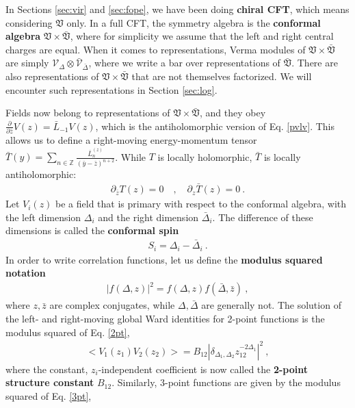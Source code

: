 \documentclass[12pt, a4paper]{article}
\theoremstyle{break}
\begin{document}
In Sections \ref{sec:vir} and \ref{sec:fope}, we have been doing \textbf{chiral CFT}, which means considering $\mathfrak{V}$ only. In a full CFT, the symmetry algebra is the \textbf{conformal algebra} $\mathfrak{V}\times \bar{\mathfrak{V}}$, where for simplicity we assume that the left and right central charges are equal. When it comes to representations, Verma modules of $\mathfrak{V}\times \bar{\mathfrak{V}}$ are simply $\mathcal{V}_\Delta\otimes \bar{\mathcal{V}}_{\bar \Delta}$, where we write a bar over representations of $\bar{\mathfrak{V}}$. There are also representations of $\mathfrak{V}\times \bar{\mathfrak{V}}$ that are not themselves factorized. We will encounter such representations in Section \ref{sec:log}. 

Fields now belong to representations of $\mathfrak{V}\times \bar{\mathfrak{V}}$, and they obey $\frac{\partial}{\partial \bar z} V(z) = \bar L_{-1} V(z)$, which is the antiholomorphic version of Eq. \eqref{pvlv}. This allows us to define a right-moving energy-momentum tensor $\bar T(y) = \sum_{n\in\mathbb{Z}} \frac{\bar L_n^{(z)}}{(\bar y-\bar z)^{n+2}}$. While $T$ is locally holomorphic, $\bar T$ is locally antiholomorphic:
\begin{align}
 \partial_{\bar z} T(z) = 0 \quad , \quad \partial_z \bar T(z) = 0 \ . 
\end{align}
Let $V_i(z)$ be a field that is primary with respect to the conformal algebra, with the left dimension $\Delta_i$ and the right dimension $\bar\Delta_i$. The difference of these dimensions is called the \textbf{conformal spin}
\begin{align}
 S_i = \Delta_i -\bar\Delta_i\ . 
 \label{sdd} 
\end{align}
In order to write correlation functions, let us define the \textbf{modulus squared notation} 
\begin{align}
 \left| f(\Delta, z)\right|^2 = f(\Delta, z)f(\bar\Delta,\bar z)\ ,
 \label{fdz2}
\end{align}
where $z,\bar z$ are complex conjugates, while $\Delta,\bar\Delta$ are generally not. The solution of the left- and right-moving global Ward identities for 2-point functions is the modulus squared of Eq. \eqref{2pt},
\begin{align}
\boxed{ \Big< V_1(z_1)V_2(z_2) \Big> = B_{12} \left|\delta_{\Delta_1,\Delta_2} z_{12}^{-2\Delta_1}\right|^2} \ ,
\label{2ptb}
\end{align}
where the constant, $z_i$-independent coefficient is now called the \textbf{2-point structure constant} $B_{12}$. Similarly, 3-point functions are given by the modulus squared of Eq. \eqref{3pt},
\end{document}

